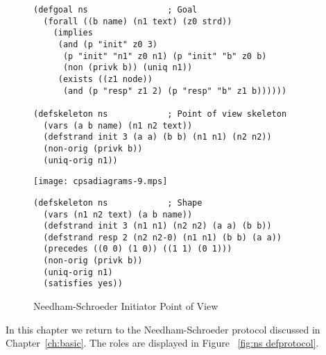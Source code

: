 \iffalse 
\begin{figure}
\begin{center}
\texttt{[image: cpsadiagrams-0.mps]}\hfil
\texttt{[image: cpsadiagrams-1.mps]}\\
\end{center}
\begin{center}
\begin{minipage}{3in}
\begin{verbatim}
(defprotocol ns basic
  (defrole init
    (vars (a b name) (n1 n2 text))
    (trace
     (send (enc n1 a (pubk b)))
     (recv (enc n1 n2 (pubk a)))
     (send (enc n2 (pubk b)))))
  (defrole resp
    (vars (b a name) (n2 n1 text))
    (trace
     (recv (enc n1 a (pubk b)))
     (send (enc n1 n2 (pubk a)))
     (recv (enc n2 (pubk b))))))
\end{verbatim}
\end{minipage}
\end{center}
\caption{Needham-Schroeder Initiator and Responder Roles}
\label{fig:ns roles 2}
\end{figure}
\fi 
\begin{figure}
\begin{verbatim}
(defgoal ns                ; Goal
  (forall ((b name) (n1 text) (z0 strd))
    (implies
     (and (p "init" z0 3)
      (p "init" "n1" z0 n1) (p "init" "b" z0 b)
      (non (privk b)) (uniq n1))
     (exists ((z1 node))
      (and (p "resp" z1 2) (p "resp" "b" z1 b))))))

(defskeleton ns            ; Point of view skeleton
  (vars (a b name) (n1 n2 text))
  (defstrand init 3 (a a) (b b) (n1 n1) (n2 n2))
  (non-orig (privk b))
  (uniq-orig n1))
\end{verbatim}
{\centering
\texttt{[image: cpsadiagrams-9.mps]}}
\begin{verbatim}
(defskeleton ns            ; Shape
  (vars (n1 n2 text) (a b name))
  (defstrand init 3 (n1 n1) (n2 n2) (a a) (b b))
  (defstrand resp 2 (n2 n2-0) (n1 n1) (b b) (a a))
  (precedes ((0 0) (1 0)) ((1 1) (0 1)))
  (non-orig (privk b))
  (uniq-orig n1)
  (satisfies yes))
\end{verbatim}
\caption{Needham-Schroeder Initiator Point of View}
\label{fig:ns init}
\end{figure}

In this chapter we return to the Needham-Schroeder protocol discussed
in Chapter~\ref{ch:basic}.  The roles are displayed in
Figure~%
\ref{fig:ns defprotocol}.

